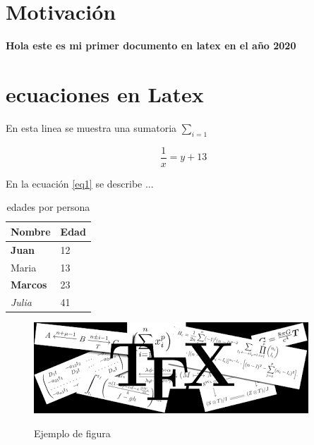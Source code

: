 \documentclass{article}
\begin{document}
\section{Motivación}

\textbf{Hola este es mi primer documento en latex en el año 2020}

\section{ecuaciones en Latex}
En esta linea se muestra una sumatoria $\sum_{i=1}$

\begin{equation}
\frac{1}{x}=y+13
\label{eq1}
\end{equation}

En la ecuación \ref{eq1}  se describe ...

\begin{table}[!htb]
\caption{edades por persona}
\centering
\begin{tabular}{|l|l|}
\hline
\textbf{Nombre} & \textbf{Edad} \\ \hline
\hline
\hline
\textbf{Juan}            & 12            \\ \hline
Maria           & 13            \\ \hline
\textbf{Marcos}          & 23            \\ \hline
\textit{Julia}           & 41            \\ \hline
\end{tabular}
\label{tab1}
\end{table}

\begin{figure}[!htp]
\caption{Ejemplo de figura}
\centering
\includegraphics[scale=0.7]{p1}
\label{f1}
\end{figure}
\end{document}
